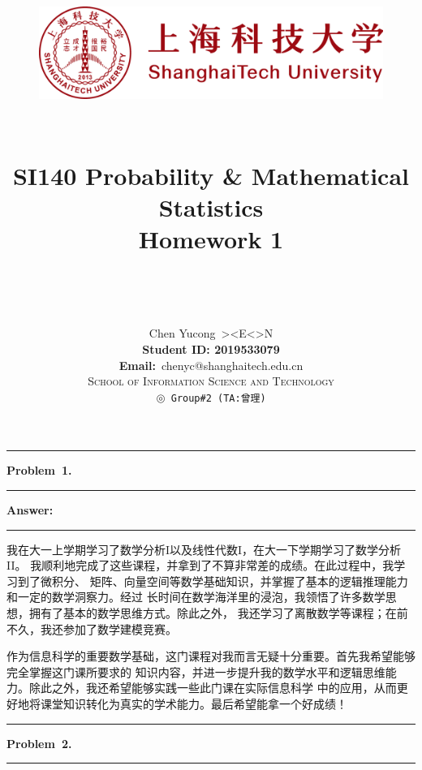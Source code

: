 \documentclass[10.5pt]{article}
\title{
	\normalfont \normalsize
	\begin{figure}[!h]
	\centering
	\includegraphics[width=4.8in, keepaspectratio]{logo_red.pdf}\\[1cm]
	\end{figure}
	\horrule{0.5pt} \\[0.4cm]
	\Huge SI140 Probability \& Mathematical Statistics\\[0.4cm]
	\LARGE Homework 1\\
	\horrule{2pt} \\[1.5cm]
}
\author{\Song{\huge\textbf{陈昱聪}}\\[0.2cm]Chen Yucong\ ><E<>N\\[4.5cm]\textbf{Student ID: 2019533079}\\[0.2cm] 
\textbf{Email:}\ {\ttfamily chenyc@shanghaitech.edu.cn}\\[0.8cm] \LARGE\textsc{School of Information Science and Technology}\\[0.63cm]
\texttt{$\circledcirc$ Group\#2\ (TA:曾理)}}
\date{}
\newcommand\question[1]{\vspace{.2in}\hrule\vspace{0.04in}\textbf{Problem\ #1.}\vspace{.4em}\hrule\vspace{.10in}}
\newcommand\Answer{\vspace{.2in}\textbf{Answer:}\vspace{.5em}\hrule\vspace{.08in}\par}
\begin{document}
	
	\maketitle
	\thispagestyle{firstpage}
	\thispagestyle{empty}
	\setcounter{page}{0}
	\pagebreak
 	\question{1}
	\Answer{}
        \qquad 我在大一上学期学习了数学分析I以及线性代数I，在大一下学期学习了数学分析II。
        我顺利地完成了这些课程，并拿到了不算非常差的成绩。在此过程中，我学习到了微积分、
        矩阵、向量空间等数学基础知识，并掌握了基本的逻辑推理能力和一定的数学洞察力。经过
        长时间在数学海洋里的浸泡，我领悟了许多数学思想，拥有了基本的数学思维方式。除此之外，
        我还学习了离散数学等课程；在前不久，我还参加了数学建模竞赛。

        \qquad 作为信息科学的重要数学基础，这门课程对我而言无疑十分重要。首先我希望能够完全掌握这门课所要求的
        知识内容，并进一步提升我的数学水平和逻辑思维能力。除此之外，我还希望能够实践一些此门课在实际信息科学
        中的应用，从而更好地将课堂知识转化为真实的学术能力。最后希望能拿一个好成绩！
	\pagebreak



	\question{2}
\end{document}
